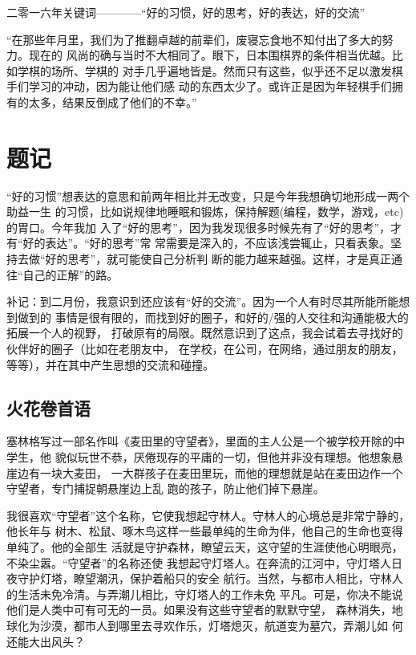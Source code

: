 \documentclass[11pt]{article}
\author{Chuan Liu}
\date{\today}
\title{}
\begin{document}
二零一六年关键词————“好的习惯，好的思考，好的表达，好的交流”

“在那些年月里，我们为了推翻卓越的前辈们，废寝忘食地不知付出了多大的努力。现在的
风尚的确与当时不大相同了。眼下，日本围棋界的条件相当优越。比如学棋的场所、学棋的
对手几乎遍地皆是。然而只有这些，似乎还不足以激发棋手们学习的冲动，因为能让他们感
动的东西太少了。或许正是因为年轻棋手们拥有的太多，结果反倒成了他们的不幸。”

\section*{题记}
\label{sec:orgheadline2}
“好的习惯”想表达的意思和前两年相比并无改变，只是今年我想确切地形成一两个助益一生
的习惯，比如说规律地睡眠和锻炼，保持解题(编程，数学，游戏，etc)的胃口。今年我加
入了“好的思考”，因为我发现很多时候先有了“好的思考”，才有“好的表达”。“好的思考”常
常需要是深入的，不应该浅尝辄止，只看表象。坚持去做“好的思考”，就可能使自己分析判
断的能力越来越强。这样，才是真正通往“自己的正解”的路。

补记：到二月份，我意识到还应该有“好的交流”。因为一个人有时尽其所能所能想到做到的
事情是很有限的，而找到好的圈子，和好的/强的人交往和沟通能极大的拓展一个人的视野，
打破原有的局限。既然意识到了这点，我会试着去寻找好的伙伴好的圈子（比如在老朋友中，
在学校，在公司，在网络，通过朋友的朋友，等等），并在其中产生思想的交流和碰撞。

\subsection*{火花卷首语}
\label{sec:orgheadline1}

塞林格写过一部名作叫《麦田里的守望者》，里面的主人公是一个被学校开除的中学生，他
貌似玩世不恭，厌倦现存的平庸的一切，但他并非没有理想。他想象悬崖边有一块大麦田，
一大群孩子在麦田里玩，而他的理想就是站在麦田边作一个守望者，专门捕捉朝悬崖边上乱
跑的孩子，防止他们掉下悬崖。

我很喜欢“守望者”这个名称，它使我想起守林人。守林人的心境总是非常宁静的，他长年与
树木、松鼠、啄木鸟这样一些最单纯的生命为伴，他自己的生命也变得单纯了。他的全部生
活就是守护森林，瞭望云天，这守望的生涯使他心明眼亮，不染尘嚣。“守望者”的名称还使
我想起守灯塔人。在奔流的江河中，守灯塔人日夜守护灯塔，瞭望潮汛，保护着船只的安全
航行。当然，与都市人相比，守林人的生活未免冷清。与弄潮儿相比，守灯塔人的工作未免
平凡。可是，你决不能说他们是人类中可有可无的一员。如果没有这些守望者的默默守望，
森林消失，地球化为沙漠，都市人到哪里去寻欢作乐，灯塔熄灭，航道变为墓穴，弄潮儿如
何还能大出风头？
\end{document}
